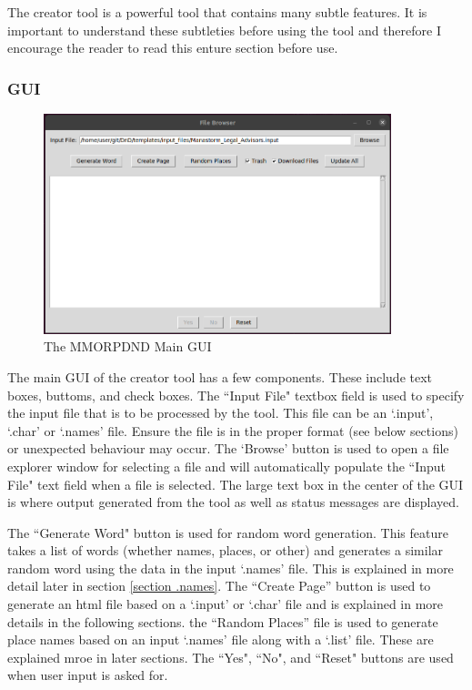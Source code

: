 The creator tool is a powerful tool that contains many subtle features. It is important to understand these subtleties before using the tool and therefore I encourage the reader to read this enture section before use. 

\subsubsection{GUI}

\begin{figure}[h]
	\centering
	\includegraphics[width=0.9\textwidth]{images/creator_gui.png}
	\caption{The MMORPDND Main GUI}
	\label{fig:creator_gui}
\end{figure}

The main GUI of the creator tool has a few components. These include text boxes, buttoms, and check boxes. 
The ``Input File" textbox field is used to specify the input file that is to be processed by the tool. This file can be an `.input', `.char' or `.names' file. Ensure the file is in the proper format (see below sections) or unexpected behaviour may occur. The `Browse' button is used to open a file explorer window for selecting a file and will automatically populate the ``Input File" text field when a file is selected. The large text box in the center of the GUI is where output generated from the tool as well as status messages are displayed.

The ``Generate Word" button is used for random word generation. This feature takes a list of words (whether names, places, or other) and generates a similar random word using the data in the input `.names' file. This is explained in more detail later in section \ref{section .names}. The ``Create Page'' button is used to generate an html file based on a `.input' or `.char' file and is explained in more details in the following sections. the ``Random Places'' file is used to generate place names based on an input `.names' file along with a `.list' file. These are explained mroe in later sections. The ``Yes", ``No", and ``Reset" buttons are used when user input is asked for.

